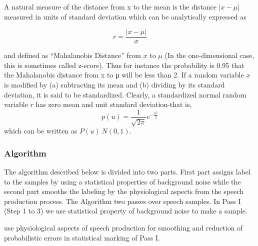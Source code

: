 \documentclass[12pt, a4paper, twoside]{report}
\begin{document}
A natural measure of the distance from x to the mean is the distance $|x - \mu |$ measured in units of standard deviation which can be analytically expressed as

\begin{equation}
r = \frac{|x - \mu |}{\sigma}
\end{equation}

and defined as ``Mahalanobis Distance'' from $x$ to $\mu$ (In the one-dimensional case, this is sometimes called z-score). Thus for instance the probability is 0.95 that the Mahalanobis distance from x to μ will be less than 2. If a random variable $x$ is modified by (a) subtracting its mean and (b) dividing by its standard deviation, it is said to be standardized. Clearly, a standardized normal random variable $r$ has zero mean and unit standard deviation-that is,
\begin{equation}
p(u) = \frac{1}{\sqrt{2\pi }} e^{-\frac{u^2}{2}}
\end{equation}
which can be written as $P(u)~N(0,1)$.

\subsubsection{Algorithm}
The algorithm described below is divided into two parts. First part assigns label to the samples by using a statistical properties of background noise while the second part smooths the labeling by the physiological aspects from the speech production process. The Algorithm two passes over speech samples. In Pass I (Step 1 to 3) we use statistical property of background noise to make a sample.
\par
use physiological aspects of speech production for smoothing and reduction of probabilistic errors in statistical marking of Pass I.
\end{document}
